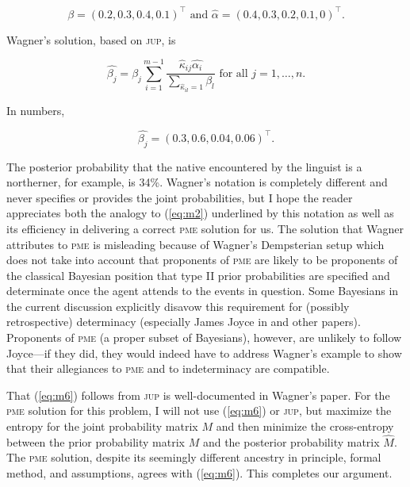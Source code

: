 \begin{equation}
  \label{eq:m5}
  \beta=(0.2,0.3,0.4,0.1)^{\top}\mbox{ and }\hat{\alpha}=(0.4,0.3,0.2,0.1,0)^{\top}.
\end{equation}

Wagner's solution, based on \textsc{jup}, is

\begin{equation}
  \label{eq:m6}
  \hat{\beta_{j}}=\beta_{j}\sum_{i=1}^{m-1}\frac{\hat{\kappa}_{ij}\hat{\alpha_{i}}}{\sum_{\hat{\kappa}_{il}=1}\beta_{l}}\mbox{ for all }j=1,\ldots,n.
\end{equation}

{\noindent}In numbers,

\begin{equation}
  \label{eq:m7}
  \hat{\beta_{j}}=(0.3,0.6,0.04,0.06)^{\top}.
\end{equation}

{\noindent}The posterior probability that the native encountered by
the linguist is a northerner, for example, is 34\%. Wagner's notation
is completely different and never specifies or provides the joint
probabilities, but I hope the reader appreciates both the analogy to
(\ref{eq:m2}) underlined by this notation as well as its efficiency in
delivering a correct \textsc{pme} solution for us. The solution that
Wagner attributes to \textsc{pme} is misleading because of Wagner's
Dempsterian setup which does not take into account that proponents of
\textsc{pme} are likely to be proponents of the classical Bayesian
position that type II prior probabilities are specified and
determinate once the agent attends to the events in question. Some
Bayesians in the current discussion explicitly disavow this
requirement for (possibly retrospective) determinacy (especially James
Joyce in  and other papers). Proponents of
\textsc{pme} (a proper subset of Bayesians), however, are unlikely to
follow Joyce---if they did, they would indeed have to address Wagner's
example to show that their allegiances to \textsc{pme} and to
indeterminacy are compatible.

That (\ref{eq:m6}) follows from \textsc{jup} is well-documented in
Wagner's paper. For the \textsc{pme} solution for this problem, I
will not use (\ref{eq:m6}) or \textsc{jup}, but maximize the entropy
for the joint probability matrix $M$ and then minimize the
cross-entropy between the prior probability matrix $M$ and the
posterior probability matrix $\hat{M}$. The \textsc{pme} solution,
despite its seemingly different ancestry in principle, formal method,
and assumptions, agrees with (\ref{eq:m6}). This completes our
argument.

